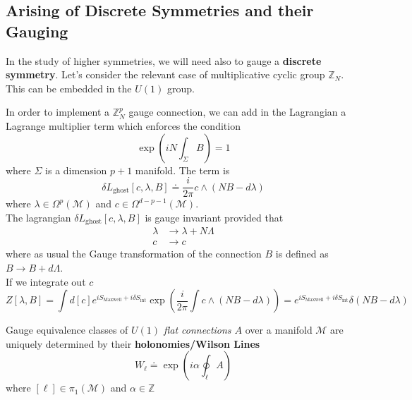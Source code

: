 \documentclass[11pt]{article}
\theoremstyle{definition}
\numberwithin{equation}{section}
\begin{document}
\subsection{Arising of Discrete Symmetries and their Gauging}
In the study of higher symmetries, we will need also to gauge a \textbf{discrete symmetry}. Let's consider the relevant case of multiplicative cyclic group $\mathbb{Z}_N$. This can be embedded in the $U(1)$ group.

In order to implement a $\mathbb{Z}^p_N$ gauge connection, we can add in the Lagrangian a Lagrange multiplier term which enforces the condition
\begin{equation}
    \exp(i N \int_{\Sigma} B) =1
\end{equation}
where $\Sigma$ is a dimension $p+1$ manifold. The term is
\begin{equation}
    \delta L_{\text{ghost}}[c, \lambda, B] \doteq \frac{i}{2 \pi} c \wedge ( N B - d \lambda)
\end{equation}
where $\lambda \in \Omega^p(\mathcal{M})$ and $c \in \Omega^{d-p-1}(\mathcal{M})$. \\
The lagrangian $\delta L_{\text{ghost}}[c, \lambda, B]$ is gauge invariant provided that
\begin{equation}
\begin{aligned}
    \lambda &\to \lambda + N \Lambda\\
    c &\to c
    \end{aligned}
\end{equation}
where as usual the Gauge transformation of the connection $B$ is defined as $B \to B + d \Lambda$. \\
If we integrate out $c$
\begin{equation}
    Z[\lambda, B] = \int d[c] e^{i S_{\text{Maxwell}} + i \delta S_{\text{int}}} \exp(\frac{i}{2 \pi} \int  c \wedge ( N B - d \lambda) ) = e^{i S_{\text{Maxwell}} + i \delta S_{\text{int}}} \delta(NB - d \lambda)
\end{equation}

\begin{thm}{}{}
\label{thm1}
Gauge equivalence classes of \textit{$U(1)$ flat connections $A$} over a manifold $\mathcal{M}$ are uniquely determined by their \textbf{holonomies/Wilson Lines}
\begin{equation}
    W_{\ell} \doteq \exp(i \alpha \oint_{\ell} A)
\end{equation}
where $[\ell] \in \pi_1(\mathcal{M})$ and $\alpha \in \mathbb{Z}$
\end{thm}
\end{document}
